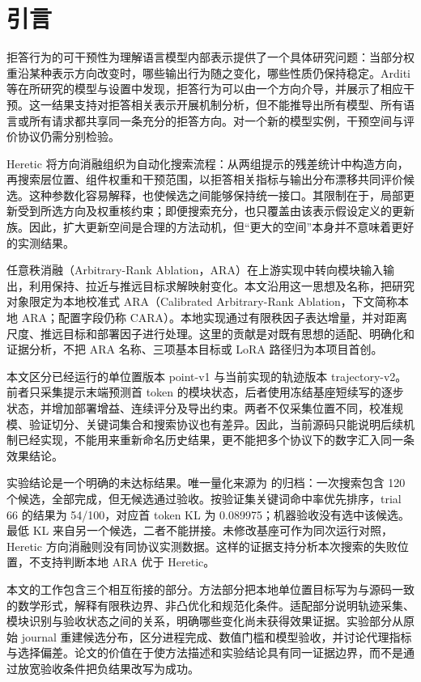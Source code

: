 \section{引言}
\label{sec:introduction}

拒答行为的可干预性为理解语言模型内部表示提供了一个具体研究问题：当部分权重沿某种表示方向改变时，哪些输出行为随之变化，哪些性质仍保持稳定。Arditi 等在所研究的模型与设置中发现，拒答行为可以由一个方向介导，并展示了相应干预\cite{arditi2024}。这一结果支持对拒答相关表示开展机制分析，但不能推导出所有模型、所有语言或所有请求都共享同一条充分的拒答方向。对一个新的模型实例，干预空间与评价协议仍需分别检验。

Heretic 将方向消融组织为自动化搜索流程：从两组提示的残差统计中构造方向，再搜索层位置、组件权重和干预范围，以拒答相关指标与输出分布漂移共同评价候选\cite{heretic}。这种参数化容易解释，也使候选之间能够保持统一接口。其限制在于，局部更新受到所选方向及权重核约束；即便搜索充分，也只覆盖由该表示假设定义的更新族。因此，扩大更新空间是合理的方法动机，但“更大的空间”本身并不意味着更好的实测结果。

任意秩消融（Arbitrary-Rank Ablation，ARA）在上游实现中转向模块输入输出，利用保持、拉近与推远目标求解映射变化\cite{upstreamara}。本文沿用这一思想及名称，把研究对象限定为本地校准式 ARA（Calibrated Arbitrary-Rank Ablation，下文简称本地 ARA；配置字段仍称 CARA）。本地实现通过有限秩因子表达增量，并对距离尺度、推远目标和部署因子进行处理。这里的贡献是对既有思想的适配、明确化和证据分析，不把 ARA 名称、三项基本目标或 LoRA 路径归为本项目首创。

本文区分已经运行的单位置版本 point-v1 与当前实现的轨迹版本 trajectory-v2。前者只采集提示末端预测首 token 的模块状态，后者使用冻结基座短续写的逐步状态，并增加部署增益、连续评分及导出约束。两者不仅采集位置不同，校准规模、验证切分、关键词集合和搜索协议也有差异。因此，当前源码只能说明后续机制已经实现，不能用来重新命名历史结果，更不能把多个协议下的数字汇入同一条效果结论。

实验结论是一个明确的未达标结果。唯一量化来源为  的归档：一次搜索包含 120 个候选，全部完成，但无候选通过验收。按验证集关键词命中率优先排序，trial 66 的结果为 54/100，对应首 token KL 为 0.089975；机器验收没有选中该候选。最低 KL 来自另一个候选，二者不能拼接。未修改基座可作为同次运行对照，Heretic 方向消融则没有同协议实测数据。这样的证据支持分析本次搜索的失败位置，不支持判断本地 ARA 优于 Heretic。

本文的工作包含三个相互衔接的部分。方法部分把本地单位置目标写为与源码一致的数学形式，解释有限秩边界、非凸优化和规范化条件。适配部分说明轨迹采集、模块识别与验收状态之间的关系，明确哪些变化尚未获得效果证据。实验部分从原始 journal 重建候选分布，区分进程完成、数值门槛和模型验收，并讨论代理指标与选择偏差。论文的价值在于使方法描述和实验结论具有同一证据边界，而不是通过放宽验收条件把负结果改写为成功。
